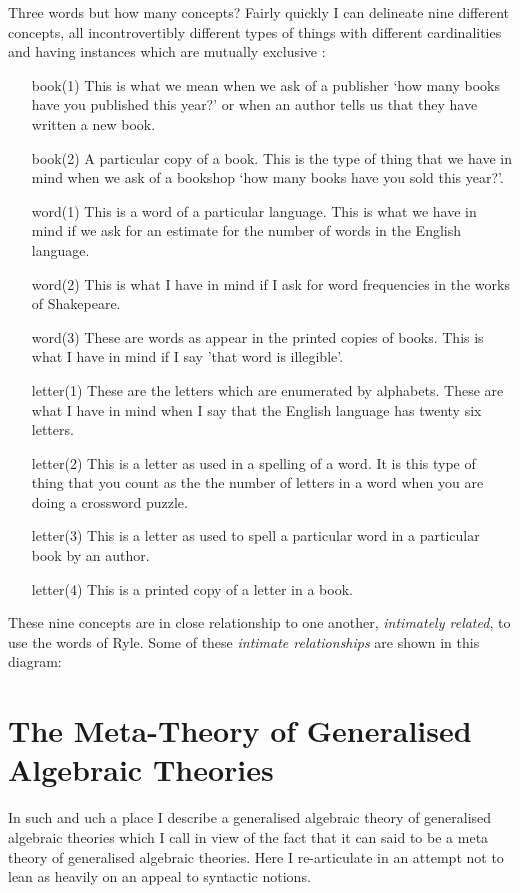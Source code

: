 \documentclass[10pt,a4paper]{article}
\begin{document}
\note 
Three words but how many concepts? Fairly quickly I can delineate nine different concepts, all incontrovertibly 
different types of things with different cardinalities and having instances which are mutually exclusive :
\begin{itemize}
\item [book(1)] This is what we mean when we ask of a publisher `how many books have you published this year?' 
or when an author tells us that they have written a new book.
\item [book(2)] A particular copy of a book. This is the type of thing that we have in mind
 when we ask of a bookshop `how many books have you sold this year?'.
\item [word(1)] This is a word of a particular language. This is what we have in mind if we ask for an estimate for the number of words 
in the English language. 
\item [word(2)] This is what I have in mind if I ask for word frequencies in the works of Shakepeare.   
\item [word(3)] These are words as appear in the printed copies of books. This is what I have in mind if I say 'that word is illegible'.
\item [letter(1)] These are the letters which are enumerated by alphabets. These are what I have in mind when I say that the English language has
twenty six letters.
\item [letter(2)] This is a letter as used in a spelling of a word. It is this type of thing that you count 
as the the number of letters in a word when you are doing a crossword puzzle. 
\item [letter(3)] This is a letter as used to spell a particular word in a particular book by an author. 
\item [letter(4)] This is a printed copy of a letter in a book. 
\end{itemize}

\note
These nine  concepts are in close relationship to one another, \textit{intimately related}, to use the words of Ryle.
Some of these \textit{intimate relationships} are shown in this diagram:
  



\section{The Meta-Theory of Generalised Algebraic Theories}
In such and uch a place I describe a generalised algebraic theory of generalised algebraic theories  
which I call  in view of the fact that it can said to be a meta theory of generalised algebraic theories.
Here I re-articulate in an attempt not to lean as heavily on an appeal to syntactic notions. 
\end{document}
